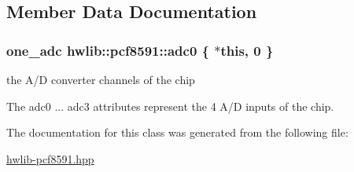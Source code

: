 \subsection{Member Data Documentation}
\subsubsection[{\texorpdfstring{adc0}{adc0}}]{\setlength{\rightskip}{0pt plus 5cm}one\+\_\+adc hwlib\+::pcf8591\+::adc0 \{ $\ast$this, 0 \}}\hypertarget{classhwlib_1_1pcf8591_a29a87f5711fbbd85ed5c477a5eab1b6f}{}\label{classhwlib_1_1pcf8591_a29a87f5711fbbd85ed5c477a5eab1b6f}


the A/D converter channels of the chip 

The adc0 ... adc3 attributes represent the 4 A/D inputs of the chip. 

The documentation for this class was generated from the following file\+:\begin{DoxyCompactItemize}
\item 
\hyperlink{hwlib-pcf8591_8hpp}{hwlib-\/pcf8591.\+hpp}\end{DoxyCompactItemize}
